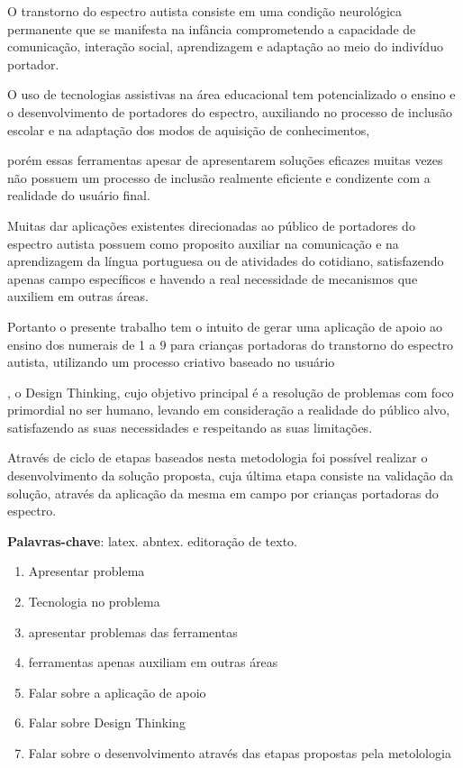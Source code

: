 \setlength{\absparsep}{18pt} %
\begin{resumo}
	O transtorno do espectro autista consiste em uma condição neurológica permanente que se manifesta na infância comprometendo a capacidade de comunicação, interação social, aprendizagem e adaptação ao meio do indivíduo portador. 

	O uso de tecnologias assistivas na área educacional tem potencializado o ensino e o desenvolvimento de portadores do espectro, auxiliando no processo de inclusão escolar e na adaptação dos modos de aquisição de conhecimentos, 

	porém essas ferramentas apesar de apresentarem soluções eficazes muitas vezes não possuem um processo de inclusão realmente eficiente e condizente com a realidade do usuário final. 

	Muitas dar aplicações existentes direcionadas ao público de portadores do espectro autista possuem como proposito auxiliar na comunicação e na aprendizagem da língua portuguesa ou de atividades do cotidiano, satisfazendo apenas campo específicos e havendo a real necessidade de mecanismos que auxiliem em outras áreas.

	Portanto o presente trabalho tem o intuito de gerar uma aplicação de apoio ao ensino dos numerais de 1 a 9 para crianças portadoras do transtorno do espectro autista, utilizando um processo criativo baseado no usuário

	, o Design Thinking, cujo objetivo principal é a resolução de problemas com foco primordial no ser humano, levando em consideração a realidade do público alvo, satisfazendo as suas necessidades e respeitando as suas limitações.  

	Através de ciclo de etapas baseados nesta metodologia foi possível realizar o desenvolvimento da solução proposta, cuja última etapa consiste na validação da solução, através da aplicação da mesma em campo por crianças portadoras do espectro.

	\textbf{Palavras-chave}: latex. abntex. editoração de texto.
	\newpage
	\begin{enumerate}
		\item Apresentar problema
		\item Tecnologia no problema
		\item apresentar problemas das ferramentas
		\item ferramentas apenas auxiliam em outras áreas
		\item Falar sobre a aplicação de apoio
		\item Falar sobre Design Thinking
		\item Falar sobre o desenvolvimento através das etapas propostas pela metolologia
	\end{enumerate}



\end{resumo}
